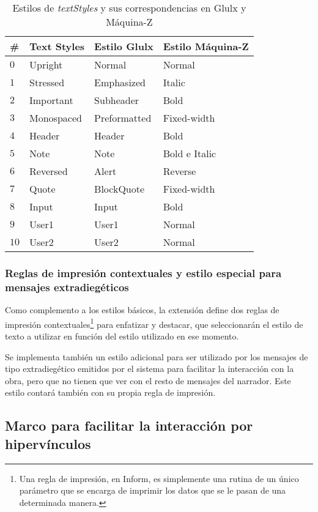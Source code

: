 \begin{table}[]
\centering
\begin{tabular}{llll}
\hline
\textbf{\#} &\textbf{Text Styles} & \textbf{Estilo Glulx} & \textbf{Estilo Máquina-Z} \\ \hline
$0$		& Upright		& Normal		& Normal		\\
$1$		& Stressed		& Emphasized	& Italic		\\
$2$		& Important		& Subheader		& Bold			\\
$3$		& Monospaced	& Preformatted	& Fixed-width	\\
$4$		& Header		& Header		& Bold			\\
$5$		& Note			& Note			& Bold e Italic	\\
$6$		& Reversed		& Alert			& Reverse		\\
$7$		& Quote			& BlockQuote	& Fixed-width	\\
$8$		& Input			& Input			& Bold			\\
$9$		& User1			& User1			& Normal		\\
$10$	& User2			& User2			& Normal		\\ \hline
\end{tabular}
\caption{Estilos de \emph{textStyles} y sus correspondencias en Glulx y Máquina-Z}
\label{table:text-styles-estilos-basicos}
\end{table}

\subsubsection{Reglas de impresión contextuales y estilo especial para mensajes extradiegéticos}

Como complemento a los estilos básicos, la extensión define dos reglas de impresión contextuales\footnote{Una regla de impresión, en Inform, es simplemente una rutina de un único parámetro que se encarga de imprimir los datos que se le pasan de una determinada manera\cite{Firth:2006}.} para enfatizar y destacar, que seleccionarán el estilo de texto a utilizar en función del estilo utilizado en ese momento.

Se implementa también un estilo adicional para ser utilizado por los mensajes de tipo extradiegético emitidos por el sistema para facilitar la interacción con la obra, pero que no tienen que ver con el resto de mensajes del narrador. Este estilo contará también con su propia regla de impresión.

\subsection{Marco para facilitar la interacción por hipervínculos}

